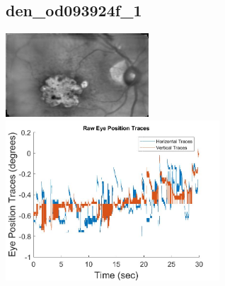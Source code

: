 \documentclass[11pt]{article}
\begin{document}
\subsection{den\_od093924f\_1}
\includegraphics[width=0.40\textwidth, valign=m]{referenceframes/rodenstock_amd/den_od093924f_1_dwt_nostim_gamscaled_bandfilt_refframe.jpg}
\includegraphics[width=0.60\textwidth, valign=m]{eyepositiontraces/rodenstock_amd/den_od093924f_1.jpg}\\
\end{document}

